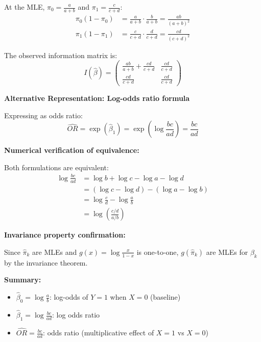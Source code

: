 \documentclass[12pt]{article}
\begin{document}
\begin{solution}
At the MLE, $\pi_0 = \frac{a}{a+b}$ and $\pi_1 = \frac{c}{c+d}$:
\begin{align*}
\pi_0(1-\pi_0) &= \frac{a}{a+b} \cdot \frac{b}{a+b} = \frac{ab}{(a+b)^2} \\
\pi_1(1-\pi_1) &= \frac{c}{c+d} \cdot \frac{d}{c+d} = \frac{cd}{(c+d)^2}
\end{align*}

The observed information matrix is:
\[
I(\hat{\beta}) = \begin{pmatrix}
\frac{ab}{a+b} + \frac{cd}{c+d} & \frac{cd}{c+d} \\
\frac{cd}{c+d} & \frac{cd}{c+d}
\end{pmatrix}
\]

\textbf{Alternative Representation: Log-odds ratio formula}

Expressing as odds ratio:
\[
\widehat{OR} = \exp(\hat{\beta}_1) = \exp\left(\log\frac{bc}{ad}\right) = \frac{bc}{ad}
\]

\textbf{Numerical verification of equivalence:}

Both formulations are equivalent:
\begin{align*}
\log\frac{bc}{ad} &= \log b + \log c - \log a - \log d \\
&= (\log c - \log d) - (\log a - \log b) \\
&= \log\frac{c}{d} - \log\frac{a}{b} \\
&= \log\left(\frac{c/d}{a/b}\right)
\end{align*}

\textbf{Invariance property confirmation:}

Since $\hat{\pi}_k$ are MLEs and $g(x) = \log\frac{x}{1-x}$ is one-to-one, $g(\hat{\pi}_k)$ are MLEs for $\beta_k$ by the invariance theorem.

\textbf{Summary:}
\begin{itemize}
\item $\hat{\beta}_0 = \log\frac{a}{b}$: log-odds of $Y=1$ when $X=0$ (baseline)
\item $\hat{\beta}_1 = \log\frac{bc}{ad}$: log odds ratio
\item $\widehat{OR} = \frac{bc}{ad}$: odds ratio (multiplicative effect of $X=1$ vs $X=0$)
\end{itemize}
\end{solution}
\end{document}
